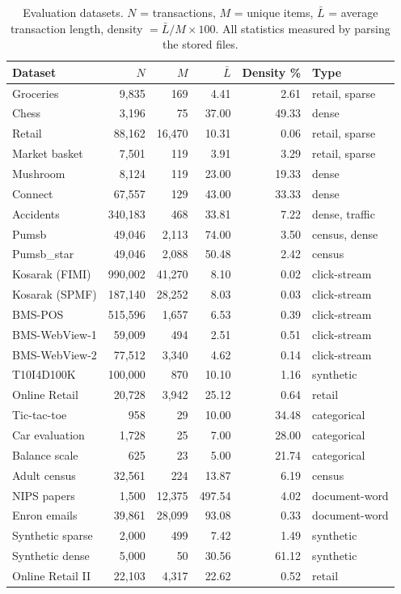 \documentclass[journal,a4paper]{IEEEtran}
\begin{document}
\begin{table}[t]
\centering
\footnotesize
\caption{Evaluation datasets. $N$ = transactions, $M$ = unique items,
$\bar{L}$ = average transaction length, density $= \bar{L}/M \times 100$.
All statistics measured by parsing the stored files.}
\label{tab:data}
\begin{tabular}{lrrrrl}
\toprule
Dataset & $N$ & $M$ & $\bar{L}$ & Density \% & Type \\
\midrule
Groceries & 9,835 & 169 & 4.41 & 2.61 & retail, sparse \\
Chess & 3,196 & 75 & 37.00 & 49.33 & dense \\
Retail & 88,162 & 16,470 & 10.31 & 0.06 & retail, sparse \\
Market basket & 7,501 & 119 & 3.91 & 3.29 & retail, sparse \\
Mushroom & 8,124 & 119 & 23.00 & 19.33 & dense \\
Connect & 67,557 & 129 & 43.00 & 33.33 & dense \\
Accidents & 340,183 & 468 & 33.81 & 7.22 & dense, traffic \\
Pumsb & 49,046 & 2,113 & 74.00 & 3.50 & census, dense \\
Pumsb\_star & 49,046 & 2,088 & 50.48 & 2.42 & census \\
Kosarak (FIMI) & 990,002 & 41,270 & 8.10 & 0.02 & click-stream \\
Kosarak (SPMF) & 187,140 & 28,252 & 8.03 & 0.03 & click-stream \\
BMS-POS & 515,596 & 1,657 & 6.53 & 0.39 & click-stream \\
BMS-WebView-1 & 59,009 & 494 & 2.51 & 0.51 & click-stream \\
BMS-WebView-2 & 77,512 & 3,340 & 4.62 & 0.14 & click-stream \\
T10I4D100K & 100,000 & 870 & 10.10 & 1.16 & synthetic \\
Online Retail & 20,728 & 3,942 & 25.12 & 0.64 & retail \\
Tic-tac-toe & 958 & 29 & 10.00 & 34.48 & categorical \\
Car evaluation & 1,728 & 25 & 7.00 & 28.00 & categorical \\
Balance scale & 625 & 23 & 5.00 & 21.74 & categorical \\
Adult census & 32,561 & 224 & 13.87 & 6.19 & census \\
NIPS papers & 1,500 & 12,375 & 497.54 & 4.02 & document-word \\
Enron emails & 39,861 & 28,099 & 93.08 & 0.33 & document-word \\
Synthetic sparse & 2,000 & 499 & 7.42 & 1.49 & synthetic \\
Synthetic dense & 5,000 & 50 & 30.56 & 61.12 & synthetic \\
Online Retail II & 22,103 & 4,317 & 22.62 & 0.52 & retail \\
\bottomrule
\end{tabular}
\end{table}
\end{document}
